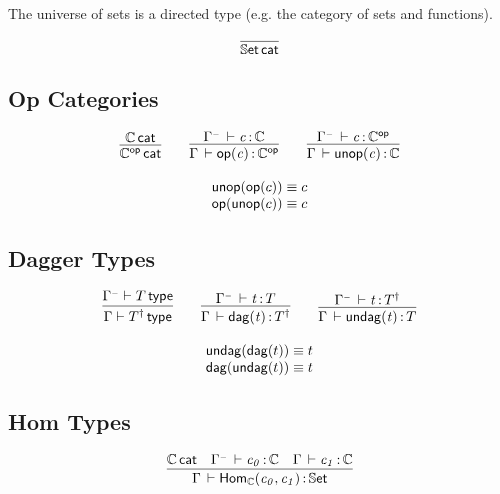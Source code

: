\documentclass[11pt]{article}
\theoremstyle{plain}
\begin{document}
The universe of sets is a directed type (e.g. the category of sets and
functions).

\[
\infer{\wfdtp{\types}}{}
\]


\subsection{Op Categories}

\[
\begin{array}{c}
\infer{\wfdtp{\optp{\C}}}
      {\wfdtp{\C}}
\qquad
\infer{\ofdtp{\Gamma}{\optm{c}}{\optp{\C}}}
      {\ofdtp{\Gamma^\con}{c}{\C}}
\qquad
\infer{\ofdtp{\Gamma}{\unop{c}}{{\C}}}
      {\ofdtp{\Gamma^\con}{c}{\optp{\C}}}
\\ \\
\unop{\optm{c}} \deq c \\
\optm{\unop{c}} \deq c
\end{array}
\]

\subsection{Dagger Types}

\[
\begin{array}{c}
\infer{\wftp{\Gamma}{\dagtp{T}}}
      {\wftp{\Gamma^\con}{T}}
\qquad
\infer{\oftp{\Gamma}{\dagtm{t}}{\dagtp{T}}}
      {\oftp{\Gamma^\con}{t}{T}}
\qquad
\infer{\oftp{\Gamma}{\undag{t}}{{T}}}
      {\oftp{\Gamma^\con}{t}{\dagtp{T}}}
\\ \\
\undag{\dagtm{t}} \deq t \\
\dagtm{\undag{t}} \deq t
\end{array}
\]

\subsection{Hom Types}

\[
\begin{array}{c}
\infer{\ofdtp{\Gamma}{\Hom{\C}{c_0}{c_1}}{\types}}
      {\wfdtp{\C} &
        \oftp{\Gamma^\con}{c_0}{\C} & 
        \oftp{\Gamma}{c_1}{\C} 
      }
\end{array}
\]
\end{document}
